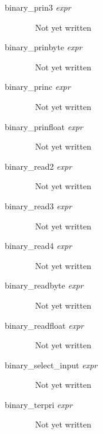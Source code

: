 \documentclass[a4paper,11pt]{article}
\begin{document}
\begin{description}
\item [{\ttfamily binary\_prin3} {\itshape  expr}]  ~\newline
Not yet written

\item [{\ttfamily binary\_prinbyte} {\itshape  expr}]  ~\newline
Not yet written

\item [{\ttfamily binary\_princ} {\itshape  expr}]  ~\newline
Not yet written

\item [{\ttfamily binary\_prinfloat} {\itshape  expr}]  ~\newline
Not yet written

\item [{\ttfamily binary\_read2} {\itshape  expr}]  ~\newline
Not yet written

\item [{\ttfamily binary\_read3} {\itshape  expr}]  ~\newline
Not yet written

\item [{\ttfamily binary\_read4} {\itshape  expr}]  ~\newline
Not yet written

\item [{\ttfamily binary\_readbyte} {\itshape  expr}]  ~\newline
Not yet written

\item [{\ttfamily binary\_readfloat} {\itshape  expr}]  ~\newline
Not yet written

\item [{\ttfamily binary\_select\_input} {\itshape  expr}]  ~\newline
Not yet written

\item [{\ttfamily binary\_terpri} {\itshape  expr}]  ~\newline
Not yet written


\end{description}
\end{document}
